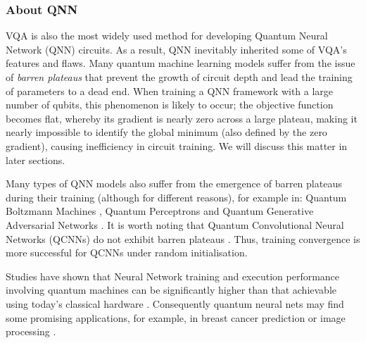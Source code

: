 \subsubsection{About QNN}
VQA is also the most widely used method for developing Quantum Neural Network (QNN) circuits.
As a result, QNN inevitably inherited some of VQA's features and flaws.
Many quantum machine learning models suffer from the issue of \textit{barren plateaus} \cite{zhaoReviewQuantumNeural2021} that prevent the growth of circuit depth and lead the training of parameters to a dead end.
When training a QNN framework with a large number of qubits, this phenomenon is likely to occur; the objective function becomes flat, whereby its gradient is nearly zero across a large plateau, making it nearly impossible to identify the global minimum (also defined by the zero gradient), \cite{mccleanBarrenPlateausQuantum2018, zhaoAnalyzingBarrenPlateau2021} causing inefficiency in circuit training.
We will discuss this matter in later sections.


Many types of QNN models also suffer from the emergence of barren plateaus during their training (although for different reasons), for example in:
Quantum Boltzmann Machines \cite{shinguBoltzmannMachineLearning2021, zoufalVariationalQuantumBoltzmann2021},
Quantum Perceptrons \cite{kristensenArtificialSpikingQuantum2021} and
Quantum Generative Adversarial Networks \cite{dallaire-demersQuantumGenerativeAdversarial2018, lloydQuantumGenerativeAdversarial2018}.
It is worth noting that Quantum Convolutional Neural Networks (QCNNs) do not exhibit barren plateaus \cite{pesahAbsenceBarrenPlateaus2021}.
Thus, training convergence is more successful for QCNNs under random initialisation.

Studies have shown that Neural Network training and execution performance involving quantum machines can be significantly higher than that achievable using today's classical hardware \cite{abbasPowerQuantumNeural2021, colesSeekingQuantumAdvantage2021}. Consequently quantum neural nets may find some promising applications, for example, in breast cancer prediction \cite{liModelAlgorithmQuantuminspired2014} or image processing \cite{matsuiQubitNeuralNetwork2009}.